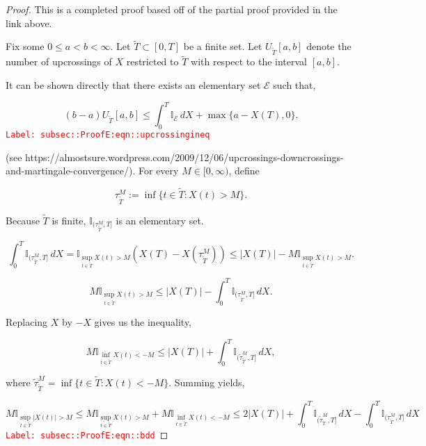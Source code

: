 \documentclass[12pt]{article}
\newcommand{\mb}{\mathbb}
\newcommand{\mc}{\mathcal}
\newcommand{\tr}{\textcolor{red}}
\newcommand{\labe}[1]{\tr{\texttt{Label: #1}}}
\newcommand{\ind}{\hspace{24pt}}
\newcommand{\T}{T}								%
\renewcommand{\t}{t}							%
\newcommand{\X}{X}								%
\newcommand{\tp}[1]{(#1)}						%
\newcommand{\alt}[1]{\widetilde{#1}}			%
\newcommand{\rt}{\tau}							%
\newcommand{\evnt}{\mc{E}}						%
\newcommand{\Tset}{\alt{T}}						%
\newcommand{\upcrs}{U}							%
\newcommand{\gid}[1]{^{#1}}						%
\newcommand{\gidd}[1]{_{#1}}					%
\begin{document}
\begin{proof}
This is a completed proof based off of the partial proof provided in the link above.

\ind Fix some \(0\leq a < b < \infty\). Let \(\Tset \subset [0,\T]\) be a finite set. Let \(\upcrs\gidd{\alt{\T}}[a,b]\) denote the number of upcrossings of \(\X\) restricted to \(\alt{\T}\) with respect to the interval \([a,b]\).

\ind It can be shown directly that there exists an elementary set \(\evnt\) such that,

\begin{equation}
(b-a)\upcrs\gidd{\Tset}[a,b] \leq \int_0^\T \mb{I}_{\evnt}\,d\X + \max\{a - \X\tp{\T},0\}.
\label{subsec::ProofE:eqn::upcrossingineq}
\end{equation}
\labe{subsec::ProofE:eqn::upcrossingineq}

(see https://almostsure.wordpress.com/2009/12/06/upcrossings-downcrossings-and-martingale-convergence/). For every \(M \in [0,\infty)\), define

\[\rt\gid{M}\gidd{\Tset} := \inf\{\t\in \alt{\T}: \X\tp{\t} > M\}.\]

Because \(\Tset\) is finite, \(\mb{I}_{(\rt\gid{M}\gidd{\Tset},\T]}\) is an elementary set.

\[\int_0^\T \mb{I}_{(\rt\gid{M}\gidd{\Tset},\T]}\,d\X = \mb{I}_{\sup_{\t\in \Tset} \X\tp{\t} > M}(\X\tp{\T} - \X\tp{\rt\gid{M}\gidd{\Tset}}) \leq |\X\tp{\T}| - M\mb{I}_{\sup_{\t \in \Tset} \X\tp{\t} > M}.\]

\[M\mb{I}_{\sup_{\t\in\Tset} \X\tp{\t} > M} \leq |\X\tp{\T}| - \int_0^T \mb{I}_{(\rt\gid{M}\gidd{\Tset},\T]}\,d\X.\]


Replacing \(\X\) by \(-\X\) gives us the inequality,

\[M\mb{I}_{\inf_{\t\in\Tset} \X\tp{\t} < -M} \leq |\X\tp{\T}| + \int_0^T \mb{I}_{(\alt{\rt}\gid{M}\gidd{\Tset},\T]}\,d\X,\]

where \(\alt{\rt}\gid{M}\gidd{\Tset} = \inf\{\t\in \Tset: \X\tp{\t} < -M\}\). Summing yields,

\begin{equation}
M\mb{I}_{\sup_{\t\in\Tset}|\X\tp{\t}| > M} \leq M\mb{I}_{\sup_{\t\in\Tset}\X\tp{\t} > M} + M\mb{I}_{\inf_{\t\in\Tset}\X\tp{\t} < -M} \leq 2|\X\tp{\T}| + \int_0^\T \mb{I}_{(\alt{\rt}\gid{M}\gidd{\Tset},\T]}\,d\X - \int_0^\T \mb{I}_{(\rt\gid{M}\gidd{\Tset},\T]}\,d\X
\label{subsec::ProofE:eqn::bdd}
\end{equation}
\labe{subsec::ProofE:eqn::bdd}


\end{proof}
\end{document}

